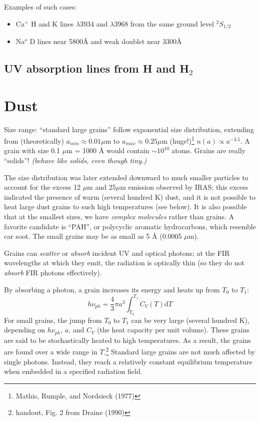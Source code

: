 \documentclass[11pt]{article}
\newcommand{\mar}[1]{\hspace{0pt}\marginpar{-\textcolor{black}{#1}-}}
\newcommand{\mynotes}[1]{{\fontfamily{cmss}\selectfont \textit{#1}}}
\let\oldsection\section
\renewcommand\section{\clearpage\oldsection}
\begin{document}
Examples of such cases:
\begin{itemize}
    \item Ca$^{+}$ H and K lines $\lambda$3934 and $\lambda$3968 from the
        same ground level $^{2}S_{1/2}$
    \item Na$^{o}$ D lines near 5800\AA{} and weak doublet near 3300\AA{}
\end{itemize}

\subsection{UV absorption lines from H and H$_{2}$}
\mar{96}


\section{Dust}
\mar{104}Size range: ``standard large grains'' follow exponential size
distribution, extending from (theoretically) $a_{min} \approx 0.01 \mu$m to
$a_{max} \approx 0.25 \mu$m (huge!)\footnote{Mathis, Rumple, and Nordsieck
(1977)} $n(a) \propto a^{-3.5}$. A grain with size 0.1 $\mu$m = 1000 \AA{}
would contain $\sim 10^{10}$ atoms. Grains are really ``solids''!
\mynotes{(behave like solids, even though tiny.)}

The size distribution was later extended downward to much smaller particles to
account for the excess 12 $\mu$m and 25$\mu$m emission observed by IRAS; this
excess indicated the presence of warm (several hundred K) dust, and it is not
possible to heat large dust grains to such high temperatures (see below). It is
also possible that at the smallest sizes, we have \textit{complex molecules}
rather than grains. A favorite candidate is ``PAH'', or polycyclic aromatic
hydrocarbons, which resemble car soot. The small grains may be as small as 5
\AA{} (0.0005 $\mu$m).

Grains can \emph{scatter} or \emph{absorb} incident UV and optical photons; at
the FIR wavelengths at which they emit, the radiation is optically thin (so
they do not \mar{105} \emph{absorb} FIR photons effectively).

By absorbing a photon, a grain increases its energy and heats up from
$T_{0}$ to $T_{1}$:
\[
    h\nu_{ph} = \frac{4}{3}{\pi}a^{3} \int_{T_{0}}^{T_{1}} {
        C_{V} (T) \mathrm{d}T }
    \]
For small grains, the jump from $T_{0}$ to $T_{1}$ can be very large
(several hundred K), depending on $h\nu_{ph}$, $a$, and $C_{V}$ (the heat
capacity per unit volume). These grains are said to be stochastically
heated to high temperatures. As a result, the grains are found over a wide
range in $T$.\footnote{handout, Fig. 2 from Draine (1990)}
Standard large grains are not much affected by single photons. Instead, they
reach a relatively constant equilibrium temperature when embedded in a
specified radiation field.
\end{document}
